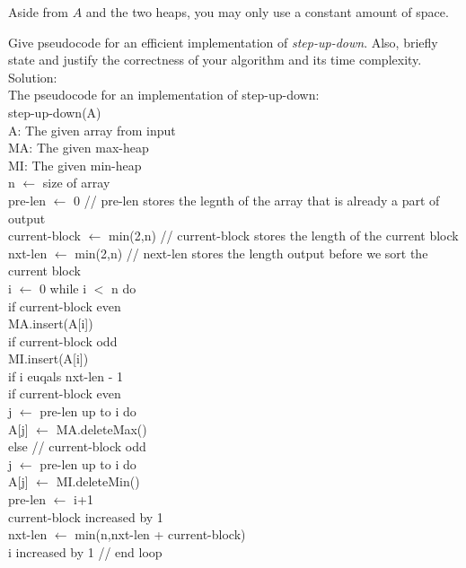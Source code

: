 \documentclass[12pt]{article}
\begin{document}
	\bigskip
	
	\noindent Aside from $A$ and the two heaps, you may only use a constant amount of space.
	
	\bigskip
	
	\noindent Give pseudocode for an efficient implementation of \emph{step-up-down}.
	Also, briefly state and justify the correctness of your algorithm and its time complexity.\\
	
	
	Solution:\\
	The pseudocode for an implementation of step-up-down:\\
	step-up-down(A)\\
	A: The given array from input\\
	MA: The given max-heap\\
	MI: The given min-heap\\
	n $\gets$ size of array\\
	pre-len $\gets$ 0 // pre-len stores the legnth of the array that is already a part of output\\
	current-block $\gets$ min(2,n) // current-block stores the length of the current block\\
	nxt-len $\gets$ min(2,n) // next-len stores the length output before we sort the current block\\
	i $\gets$ 0 while i $<$ n do\\
	\hphantom{1111} if current-block even\\
	\hphantom{11111111} MA.insert(A[i])\\
	\hphantom{1111} if current-block odd\\
	\hphantom{11111111} MI.insert(A[i])\\
	\hphantom{1111} if i euqals nxt-len - 1\\
	\hphantom{11111111} if current-block even\\
	\hphantom{111111111111} j $\gets$ pre-len up to i do\\
	\hphantom{1111111111111111} A[j] $\gets$ MA.deleteMax()\\
	\hphantom{11111111} else // current-block odd\\
	\hphantom{111111111111} j $\gets$ pre-len up to i do\\
	\hphantom{1111111111111111} A[j] $\gets$ MI.deleteMin()\\
	\hphantom{11111111} pre-len $\gets$ i+1\\
	\hphantom{11111111} current-block increased by 1\\
	\hphantom{11111111} nxt-len $\gets$ min(n,nxt-len + current-block)\\
	\hphantom{1111} i increased by 1 // end loop\\
	
\end{document}
